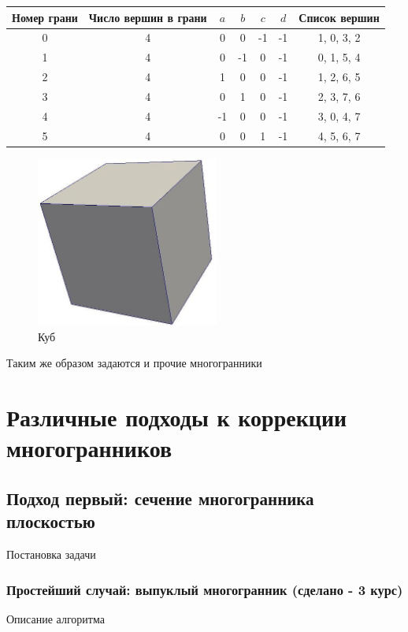 \documentclass[a4paper,12pt, titlepage]{article}
\begin{document}
\begin{flushleft}
  \begin{tabular}{|c|c|c|c|c|c|c|}
    \hline
      Номер грани & Число вершин в грани & $a$ & $b$ & $c$ & $d$ & Список вершин \\
    \hline
      0 & 4 &       0 & 0 &-1 &-1&      1, 0, 3, 2 \\
      1 & 4 &       0 &-1 & 0 &-1&      0, 1, 5, 4 \\
      2 & 4 &       1 & 0 & 0 &-1&      1, 2, 6, 5 \\
      3 & 4 &       0 & 1 & 0 &-1&      2, 3, 7, 6 \\
      4 & 4 &      -1 & 0 & 0 &-1&      3, 0, 4, 7 \\
      5 & 4 &       0 & 0 & 1 &-1&      4, 5, 6, 7 \\
    \hline
  \end{tabular}
\end{flushleft}
\begin{flushleft}
  \begin{figure}[h]
    \includegraphics[clip, width=6cm]{img/cube.jpeg}
    \caption{Куб}\label{poly-cube}
  \end{figure}
\end{flushleft}
\begin{flushleft}
 Таким же образом задаются и прочие многогранники
\end{flushleft}




\section{Различные подходы к коррекции многогранников}

\subsection{Подход первый: сечение многогранника плоскостью}
Постановка задачи
\subsubsection{Простейший случай: выпуклый многогранник (сделано - 3 курс)}
Описание алгоритма
\end{document}
